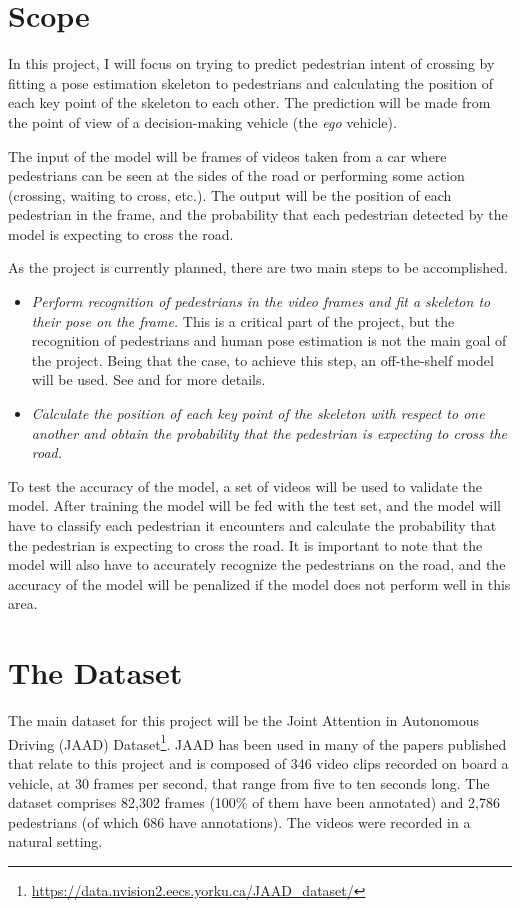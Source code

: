 \documentclass[journal,letterpaper]{IEEEtran}
\begin{document}
\section{Scope}\label{sec:scope}
In this project, I will focus on trying to predict pedestrian intent of crossing by fitting a pose estimation skeleton to pedestrians and calculating the position of each key point of the skeleton to each other. The prediction will be made from the point of view of a decision-making vehicle (the \emph{ego} vehicle).

The input of the model will be frames of videos taken from a car where pedestrians can be seen at the sides of the road or performing some action (crossing, waiting to cross, etc.). The output will be the position of each pedestrian in the frame, and the probability that each pedestrian detected by the model is expecting to cross the road.

As the project is currently planned, there are two main steps to be accomplished.
\begin{itemize}
  \item[1.] \emph{Perform recognition of pedestrians in the video frames and fit a skeleton to their pose on the frame.} This is a critical part of the project, but the recognition of pedestrians and human pose estimation is not the main goal of the project. Being that the case, to achieve this step, an off-the-shelf model will be used. See \cite{SunXLW19} and \cite{DBLP:journals/corr/abs-1812-08008} for more details.
  \item[2.] \emph{Calculate the position of each key point of the skeleton with respect to one another and obtain the probability that the pedestrian is expecting to cross the road.} 
\end{itemize}

To test the accuracy of the model, a set of videos will be used to validate the model. After training the model will be fed with the test set, and the model will have to classify each pedestrian it encounters and calculate the probability that the pedestrian is expecting to cross the road. It is important to note that the model will also have to accurately recognize the pedestrians on the road, and the accuracy of the model will be penalized if the model does not perform well in this area. 
%
\section{The Dataset}\label{sec:dataset}
The main dataset for this project will be the Joint Attention in Autonomous Driving (JAAD) Dataset\footnote{\url{https://data.nvision2.eecs.yorku.ca/JAAD_dataset/}}. JAAD has been used in many of the papers published that relate to this project and is composed of 346 video clips recorded on board a vehicle, at 30 frames per second, that range from five to ten seconds long. The dataset comprises 82,302 frames (100\% of them have been annotated) and 2,786 pedestrians (of which 686 have annotations). The videos were recorded in a natural setting.
\end{document}
